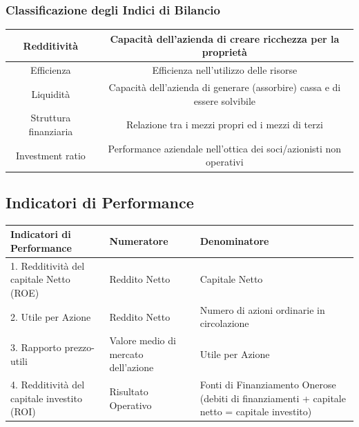\documentclass{article}
\begin{document}
\subsubsection{Classificazione degli Indici di Bilancio}
\begin{center}
    \renewcommand{\arraystretch}{2.5}
    \begin{tabular}{|c|c|}
        \hline
        Redditività & Capacità dell’azienda di creare ricchezza per
        la proprietà\\
        \hline 
        Efficienza & Efficienza nell’utilizzo delle risorse\\
        \hline 
        Liquidità & Capacità dell’azienda di generare (assorbire)
        cassa e di essere solvibile\\
        \hline 
        Struttura finanziaria & Relazione tra i mezzi propri ed i mezzi di terzi \\
        \hline 
        Investment ratio & Performance aziendale nell’ottica dei
        soci/azionisti non operativi\\    
        \hline 
    \end{tabular}
\end{center}


\subsection{Indicatori di Performance}
\begin{center}
    \renewcommand{\arraystretch}{2}
    \begin{tabular}{|p{5cm}|p{5cm}|p{5cm}|}
        \hline 
        \textbf{Indicatori di Performance} & \textbf{Numeratore} & \textbf{Denominatore}\\
        \hline 
        1. Redditività del capitale Netto (ROE) & Reddito Netto & Capitale Netto\\
        \hline 
        2. Utile per Azione & Reddito Netto & Numero di azioni ordinarie in
        circolazione\\
        \hline 
        3. Rapporto prezzo-utili & Valore medio di mercato
        dell’azione & Utile per Azione\\
        \hline
        4. Redditività del capitale investito (ROI) & Risultato Operativo & Fonti di Finanziamento Onerose
        (debiti di finanziamenti + capitale
        netto = capitale investito)\\
        \hline 
    \end{tabular}
\end{center}
\end{document}
